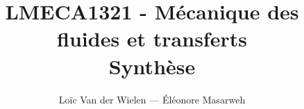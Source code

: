 \documentclass[a4paper,11pt]{report}
\title{LMECA1321 - Mécanique des fluides et transferts\\Synthèse}
\author{Loïc Van der Wielen --- Éléonore Masarweh}
\begin{document}
\maketitle
\tableofcontents







\begin{appendix}
  
\end{appendix}
\end{document}
